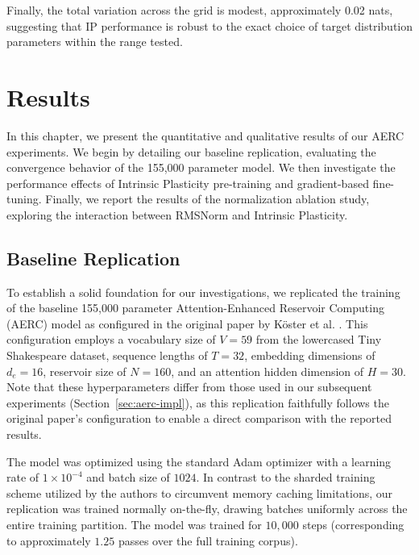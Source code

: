 \documentclass{sapthesis}
\begin{document}
Finally, the total variation across the grid is modest, approximately 0.02 nats, suggesting that IP performance is robust to the exact choice of target distribution parameters within the range tested.


\chapter{Results}
\label{ch:results}
In this chapter, we present the quantitative and qualitative results of our AERC experiments. We begin by detailing our baseline replication, evaluating the convergence behavior of the 155,000 parameter model. We then investigate the performance effects of Intrinsic Plasticity pre-training and gradient-based fine-tuning. Finally, we report the results of the normalization ablation study, exploring the interaction between RMSNorm and Intrinsic Plasticity.

\section{Baseline Replication}
\label{sec:results-baseline}

To establish a solid foundation for our investigations, we replicated the training of the baseline 155,000 parameter Attention-Enhanced Reservoir Computing (AERC) model as configured in the original paper by Köster et al. \cite{koster2024attentionenhancedreservoircomputing}. This configuration employs a vocabulary size of $V=59$ from the lowercased Tiny Shakespeare dataset, sequence lengths of $T=32$, embedding dimensions of $d_e=16$, reservoir size of $N=160$, and an attention hidden dimension of $H=30$. Note that these hyperparameters differ from those used in our subsequent experiments (Section~\ref{sec:aerc-impl}), as this replication faithfully follows the original paper's configuration to enable a direct comparison with the reported results.

The model was optimized using the standard Adam optimizer with a learning rate of $1 \times 10^{-4}$ and batch size of $1024$. In contrast to the sharded training scheme utilized by the authors to circumvent memory caching limitations, our replication was trained normally on-the-fly, drawing batches uniformly across the entire training partition. The model was trained for $10,000$ steps (corresponding to approximately $1.25$ passes over the full training corpus).
\end{document}
